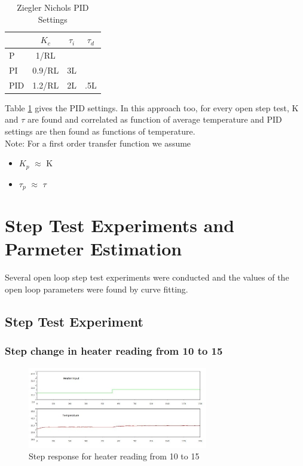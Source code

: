 
\begin{table}[h]
	\centering
	\begin{tabular}{|l||c|c|c|}\hline
		  & $K_c$ & $\tau_i$ & $\tau_d$ \\ \hline \hline
		P & 1/RL & & \\ \hline
		PI & 0.9/RL & 3L& \\ \hline
		PID & 1.2/RL & 2L & .5L\\ \hline
	\end{tabular}
	\caption{Ziegler Nichols PID Settings}
	\label{ziegler}
\end{table}


Table \ref{ziegler} gives the PID settings. In this approach too, for every open step test, K and $\tau$ are found and 
correlated as function of average temperature and PID settings are then found as functions of temperature.
\\Note: For a first order transfer function we assume
\begin{itemize}
	\item $K_p$ $\approx$ K 
	\item $\tau_p$ $\approx$ $\tau$
\end{itemize}

\section{Step Test Experiments and Parmeter Estimation}
Several open loop step test experiments were conducted and the values of the open loop parameters were found by curve 
fitting. 
\subsection{Step Test Experiment}
\subsubsection{Step change in heater reading from 10 to 15}

	
\begin{figure}
\centering	\includegraphics[width=0.7\textwidth]{Vikas_self/report_tex/parameter_estimation/10to15.jpg}
	\caption{Step response for heater reading from 10 to 15}
	\label{fig:10to15}
\end{figure}

